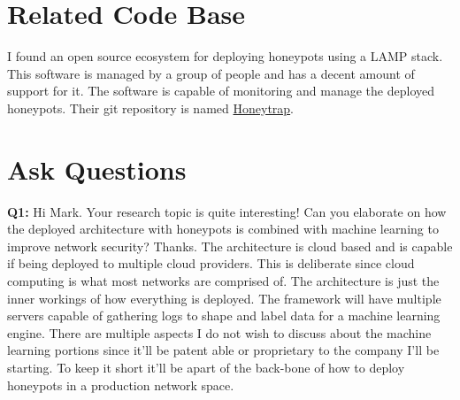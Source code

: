 \documentclass[journal]{IEEEtran}
\begin{document}
    \section{Related Code Base}
    \label{sec:code}
        I found an open source ecosystem for deploying honeypots using a LAMP stack.
        This software is managed by a group of people and has a decent amount of support for it.
        The software is capable of monitoring and manage the deployed honeypots.
        Their git repository is named \href{https://github.com/honeytrap/honeytrap}{Honeytrap}.

    \section{Ask Questions}

    \textbf{Q1:} Hi Mark. Your research topic is quite interesting! Can you elaborate on how the deployed architecture with honeypots is combined with machine learning to improve network security? Thanks.
    \newline
    The architecture is cloud based and is capable if being deployed to multiple cloud providers. This is deliberate since cloud computing is what most networks are comprised of. The architecture is just the inner workings of how everything is deployed. The framework will have multiple servers capable of gathering logs to shape and label data for a machine learning engine. There are multiple aspects I do not wish to discuss about the machine learning portions since it'll be patent able or proprietary to the company I'll be starting. To keep it short it'll be apart of the back-bone of how to deploy honeypots in a production network space.


    \flushend
\end{document}
